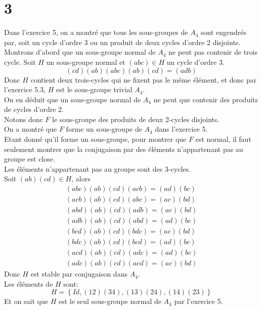 \documentclass[11pt, a4paper, twoside]{article}
\begin{document}
\section*{3}
Dans l'exercice 5, on a montré que tous les sous-groupes de $A_4$ sont engendrés par, soit un cycle d'ordre 3 ou un produit de deux cycles d'ordre 2 disjoints.\\
Montrons d'abord que un sous-groupe normal de $A_4$ ne peut pas contenir de trois cycle.
Soit $H$ un sous-groupe normal et $( abc)\in H $ un cycle d'ordre 3.
\[ 
	( cd)( ab) (abc ) ( ab) ( cd) = ( adb) 
\]
Donc $H$ contient deux trois-cycles qui ne fixent pas le même élément, et donc par l'exercice 5.3, $H$ est le sous-groupe trivial $A_4$.\\
On en déduit que un sous-groupe normal de $A_4$ ne peut que contenir des produits de cycles d'ordre 2.\\
Notons donc $F$ le sous-groupe des produits de deux 2-cycles disjoints.\\
On a montré que $F$ forme un sous-groupe de $A_4$ dans l'exercice 5.\\
Etant donné qu'il forme un sous-groupe, pour montrer que $F$ est normal, il faut seulement montrer que la conjugaison par des éléments n'appartenant pas au groupe est close.\\
Les éléments n'appartenant pas au groupe sont des 3-cycles.\\
Soit $( ab) ( cd) \in H$, alors
\begin{align*}
	( abc) ( ab) ( cd) ( acb) = ( ad) ( bc)\\
	( acb) ( ab) ( cd) ( abc) = ( ac) ( bd)\\
	( abd) ( ab) ( cd) ( adb) = ( ac) ( bd)\\
	( adb) ( ab) ( cd) ( abd) = ( ad) ( bc)\\
	( bcd) ( ab) ( cd) ( bdc) = ( ac) ( bd)\\
	( bdc) ( ab) ( cd) ( bcd) = ( ad) ( bc)\\
	( acd) ( ab) ( cd) ( adc) = ( ad) ( bc)\\
	( adc) ( ab) ( cd) ( acd) = ( ac) ( bd) 
\end{align*}
Donc $H$ est stable par conjugaison dans $A_4$.\\
Les éléments de $H$ sont:
\[ 
	H = \left\{ Id, ( 12)( 34) , ( 13) ( 24), ( 14)( 23)  \right\} 
\]
Et on sait que $H$ est le seul sous-groupe normal de $A_4$ par l'exercice 5.
\end{document}
